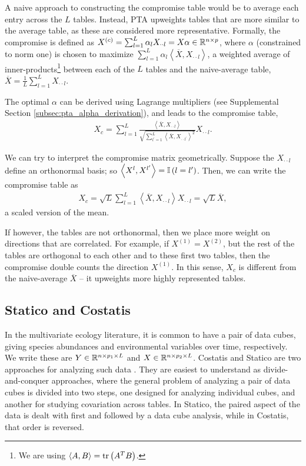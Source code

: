 \documentclass{article}
\begin{document}
A naive approach to constructing the compromise table would be to average each
entry across the $L$ tables. Instead, PTA upweights tables that are more similar
to the average table, as these are considered more representative. Formally, the
compromise is defined as $X^{(c)} = \sum_{l = 1}^{L}\alpha_{l} X_{\cdot\cdot l}
= X\alpha \in \mathbb{R}^{n \times p}$, where $\alpha$ (constrained to norm one) is
chosen to maximize $\sum_{l = 1}^{L} \alpha_{l} \left<\overline{X},
X_{\cdot\cdot l}\right>$, a weighted average of inner-products\footnote{We are
  using $\left<A, B\right> = \mathop\mathrm{tr}\left(A^{T}B\right)$.} between each of the $L$
tables and the naive-average table, $\overline{X} = \frac{1}{L}\sum_{l = 1}^{L}
X_{\cdot\cdot l}$.

The optimal $\alpha$ can be derived using Lagrange multipliers (see Supplemental
Section \ref{subsec:pta_alpha_derivation}), and leads to the compromise table,
\begin{align*}
  X_{c} = \sum_{l = 1}^{L} \frac{\left<\overline{X}, X_{\cdot\cdot l}\right>}{\sqrt{\sum_{l^{\prime}
      =1}^{L}\left<\overline{X},
      X_{\cdot\cdot l^{\prime}}\right>^{2}}} X_{\cdot\cdot l}.
\end{align*}

We can try to interpret the compromise matrix geometrically. Suppose
the $X_{\cdot\cdot l}$ define an orthonormal basis; so $\left<X^{l},
  X^{l^{\prime}}\right> = \mathbb{I}\left({l = l^{\prime}}\right)$. Then, we can write
the compromise table as
\begin{align*}
  X_{c} = \sqrt{L}\sum_{l = 1}^{L}\left<\overline{X},
    X_{\cdot\cdot l}\right>X_{\cdot\cdot l} = \sqrt{L}\overline{X},
\end{align*}
a scaled version of the mean.

If however, the tables are not orthonormal, then we place more weight
on directions that are correlated. For example, if $X^{(1)} =
X^{(2)}$, but the rest of the tables are orthogonal to each other and
to these first two tables, then the compromise double counts the
direction $X^{(1)}$. In this sense, $X_{c}$ is different from the
naive-average $\overline{X}$ -- it upweights more highly
represented tables.

\subsection{Statico and Costatis}
\label{subsec:statico_and_costatis}

In the multivariate ecology literature, it is common to have a pair of data
cubes, giving species abundances and environmental variables over time,
respectively. We write these are $Y \in \mathbb{R}^{n \times p_{1} \times L}$ and $X
\in \mathbb{R}^{n \times p_{2} \times L}$. Costatis and Statico are two approaches
for analyzing such data \cite{thioulouse2011simultaneous}. They are easiest to
understand as divide-and-conquer approaches, where the general problem of
analyzing a pair of data cubes is divided into two steps, one designed for analyzing
individual cubes, and another for studying covariation across tables. In Statico, the paired
aspect of the data is dealt with first and followed by a data cube analysis,
while in Costatis, that order is reversed.
\end{document}
